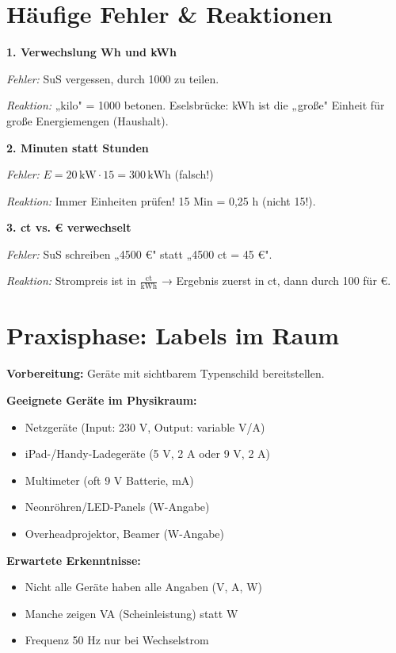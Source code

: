 \documentclass[11pt, a4paper]{article}
\newcommand{\ein}[1]{\,\mathrm{#1}}
\begin{document}
\section*{Häufige Fehler \& Reaktionen}

\begin{warnbox}
\textbf{1. Verwechslung Wh und kWh}

\textit{Fehler:} SuS vergessen, durch 1000 zu teilen.

\textit{Reaktion:} „kilo" = 1000 betonen. Eselsbrücke: kWh ist die „große" Einheit für große Energiemengen (Haushalt).
\end{warnbox}

\begin{warnbox}
\textbf{2. Minuten statt Stunden}

\textit{Fehler:} $E = 20\ein{kW} \cdot 15 = 300\ein{kWh}$ (falsch!)

\textit{Reaktion:} Immer Einheiten prüfen! 15 Min = 0,25 h (nicht 15!).
\end{warnbox}

\begin{warnbox}
\textbf{3. ct vs. € verwechselt}

\textit{Fehler:} SuS schreiben „4500 €" statt „4500 ct = 45 €".

\textit{Reaktion:} Strompreis ist in $\frac{\text{ct}}{\text{kWh}}$ → Ergebnis zuerst in ct, dann durch 100 für €.
\end{warnbox}


\section*{Praxisphase: Labels im Raum}

\begin{lehrerbox}
\textbf{Vorbereitung:} Geräte mit sichtbarem Typenschild bereitstellen.

\textbf{Geeignete Geräte im Physikraum:}
\begin{itemize}[leftmargin=1.5em, itemsep=2pt]
    \item Netzgeräte (Input: 230 V, Output: variable V/A)
    \item iPad-/Handy-Ladegeräte (5 V, 2 A oder 9 V, 2 A)
    \item Multimeter (oft 9 V Batterie, mA)
    \item Neonröhren/LED-Panels (W-Angabe)
    \item Overheadprojektor, Beamer (W-Angabe)
\end{itemize}

\textbf{Erwartete Erkenntnisse:}
\begin{itemize}[leftmargin=1.5em, itemsep=2pt]
    \item Nicht alle Geräte haben alle Angaben (V, A, W)
    \item Manche zeigen VA (Scheinleistung) statt W
    \item Frequenz 50 Hz nur bei Wechselstrom
\end{itemize}
\end{lehrerbox}
\end{document}
